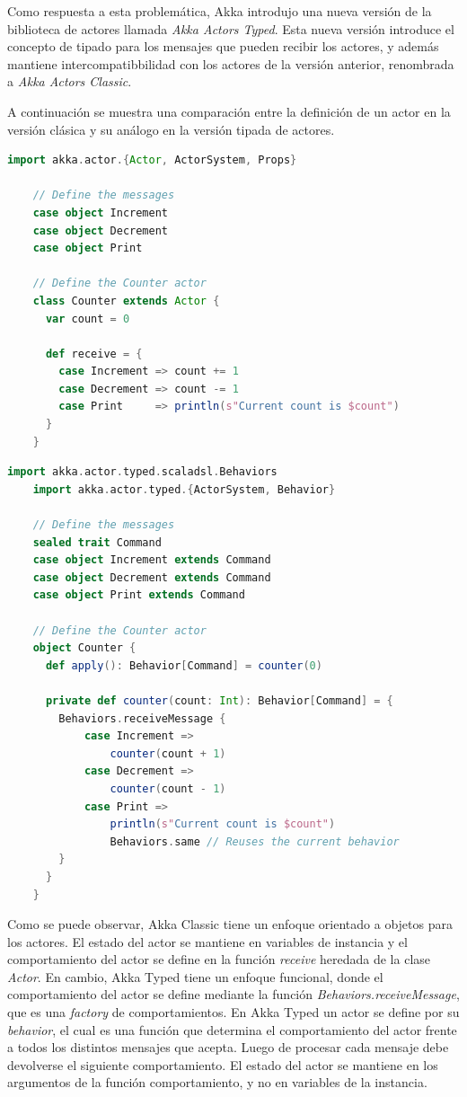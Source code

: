 Como respuesta a esta problemática, Akka introdujo una nueva versión de la biblioteca de actores llamada \textit{Akka Actors Typed}.
Esta nueva versión introduce el concepto de tipado para los mensajes que pueden recibir los actores, y además mantiene intercompatibbilidad
con los actores de la versión anterior, renombrada a \textit{Akka Actors Classic}.

A continuación se muestra una comparación entre la definición de un actor en la versión clásica y su análogo en la versión tipada de actores.

\newpage

\begin{lstlisting}[language=Scala, caption={\textbf{Ejemplo de Actor en Akka Actors Classic}}]
    import akka.actor.{Actor, ActorSystem, Props}

    // Define the messages
    case object Increment
    case object Decrement
    case object Print
    
    // Define the Counter actor
    class Counter extends Actor {
      var count = 0
    
      def receive = {
        case Increment => count += 1
        case Decrement => count -= 1
        case Print     => println(s"Current count is $count")
      }
    }
\end{lstlisting}

\begin{lstlisting}[language=Scala, caption={\textbf{Ejemplo de Actor en Akka Actors Typed}}]
    import akka.actor.typed.scaladsl.Behaviors
    import akka.actor.typed.{ActorSystem, Behavior}
    
    // Define the messages
    sealed trait Command
    case object Increment extends Command
    case object Decrement extends Command
    case object Print extends Command
    
    // Define the Counter actor
    object Counter {
      def apply(): Behavior[Command] = counter(0)
    
      private def counter(count: Int): Behavior[Command] = {
        Behaviors.receiveMessage {
            case Increment =>
                counter(count + 1)
            case Decrement =>
                counter(count - 1)
            case Print =>
                println(s"Current count is $count")
                Behaviors.same // Reuses the current behavior
        }
      }
    }
\end{lstlisting}

Como se puede observar, Akka Classic tiene un enfoque orientado a objetos para los actores.
El estado del actor se mantiene en variables de instancia y el comportamiento del actor se define en la función
\textit{receive} heredada de la clase \textit{Actor}. En cambio, Akka Typed tiene un enfoque funcional, donde el comportamiento
del actor se define mediante la función \textit{Behaviors.receiveMessage}, que es una \textit{factory} de comportamientos.
En Akka Typed un actor se define por su \textit{behavior}, el cual es una función que determina el comportamiento del actor
frente a todos los distintos mensajes que acepta. Luego de procesar cada mensaje debe devolverse el siguiente comportamiento.
El estado del actor se mantiene en los argumentos de la función comportamiento, y no en variables de la instancia.

